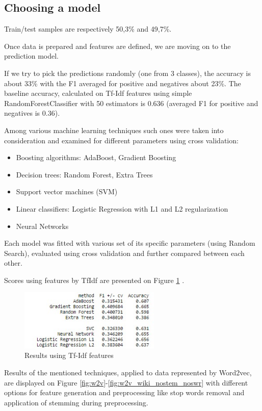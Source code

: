 \documentclass[12pt,a4paper]{article}
\begin{document}
\subsection{Choosing a model}

Train/test samples are respectively 50,3\% and 49,7\%.

Once data is prepared and features are defined, we are moving on to the prediction model.

If we try to pick the predictions randomly (one from 3 classes), the accuracy is about 33\% with the F1 averaged for positive and negatives about 23\%. The baseline accuracy, calculated on Tf-Idf features using simple RandomForestClassifier with 50 estimators is 0.636 (averaged F1 for positive and negatives is 0.36).

Among various machine learning techniques such ones were taken into consideration and examined for different parameters using cross validation:
\begin{itemize}
\item Boosting algorithms: AdaBoost, Gradient Boosting
\item Decision trees: Random Forest, Extra Trees
\item Support vector machines (SVM)
\item Linear classifiers: Logistic Regression with L1 and L2 regularization
\item Neural Networks
\end{itemize}

Each model was fitted with various set of its specific parameters (using Random Search), evaluated using cross validation and further compared between each other. 

Scores using features by TfIdf are presented on Figure \ref{fig:tfidf} .
\newline
\begin{figure}
\centering
\includegraphics[width=0.6\textwidth]{figures/results_tfidf.jpg}
\caption{Results using Tf-Idf features}
\label{fig:tfidf}
\end{figure}

Results of the mentioned techniques, applied to data represented by Word2vec, are displayed on Figure \ref{fig:w2v}-\ref{fig:w2v_wiki_nostem_noswr} with different options for feature generation and preprocessing like stop words removal and application of stemming during preprocessing.
\end{document}

